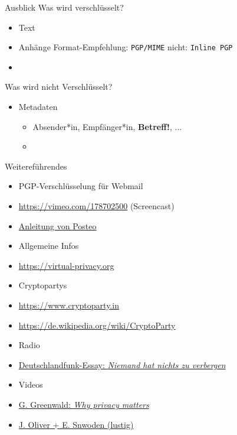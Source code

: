 \documentclass{beamer}
\begin{document}

\begin{frame}[label=bg3a]{Ausblick}
Was wird verschlüsselt?
\begin{itemize}
\item Text
\item Anhänge {\tiny Format-Empfehlung: \texttt{PGP/MIME} \quad nicht: \texttt{Inline PGP}}
\item[]
\end{itemize}
Was wird nicht Verschlüsselt?
\begin{itemize}
 \item Metadaten
 \begin{itemize}
  \item Absender*in, Empfänger*in, \textbf{Betreff!}, ...
  \item[]
 \end{itemize}
\end{itemize}
\end{frame}


\begin{frame}{Weitereführendes}

\begin{itemize}
\item[] \hspace{-2em} PGP-Verschlüsselung für Webmail
  \item \url{https://vimeo.com/178702500} (Screencast)\\[2mm]
  \item \href{https://posteo.de/hilfe/wie-installiere-ich-eine-ende-zu-ende-verschluesselung-pgp-im-browser}{Anleitung von Posteo}
  \item[] \hspace{-2em} Allgemeine Infos
  \item \url{https://virtual-privacy.org}
  \item[] \hspace{-2em} Cryptopartys
  \item \url{https://www.cryptoparty.in}
  \item \url{https://de.wikipedia.org/wiki/CryptoParty}
  \item[] \hspace{-2em} Radio
  \item \href{http://www.deutschlandfunk.de/ein-essay-ueber-geheimnisse-niemand-hat-nichts-zu-verbergen.1184.de.html?dram:article_id=395252}{Deutschlandfunk-Essay: \textit{Niemand hat nichts zu verbergen}}
  \item[] \hspace{-2em} Videos
  \item \href{https://www.ted.com/talks/glenn_greenwald_why_privacy_matters}{G. Greenwald: \textit{Why privacy matters}}
  \item \href{https://www.youtube.com/watch?v=XEVlyP4_11M}{J. Oliver + E. Snwoden (lustig)}
\end{itemize}
\end{frame}
\end{document}
